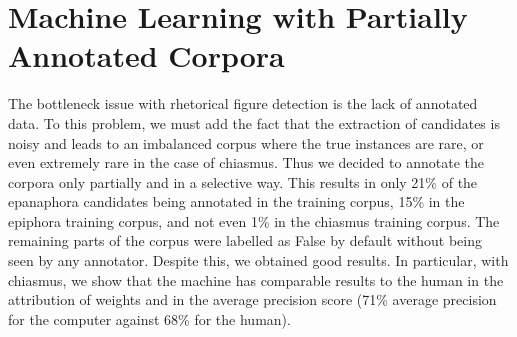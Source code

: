 \section{Machine Learning with Partially Annotated Corpora}
The bottleneck issue with rhetorical figure detection is the lack of annotated data. To this problem, we must add the fact that the extraction of candidates is noisy and leads to an imbalanced corpus where the true instances are rare, or even extremely rare in the case of chiasmus. Thus we decided to annotate the corpora only partially and in a selective way. This results in only 21\% of the epanaphora candidates being annotated in the training corpus, 15\% in the epiphora training corpus, and not even 1\% in the chiasmus training corpus. The remaining parts of the corpus were labelled as False by default without being seen by any annotator. Despite this, we obtained good results. In particular, with chiasmus, we show that the machine has comparable results to the human in the attribution of weights and in the average precision score (71\% average precision for the computer against 68\% for the human). 

%
%
%
%
%
%
%
%
%

